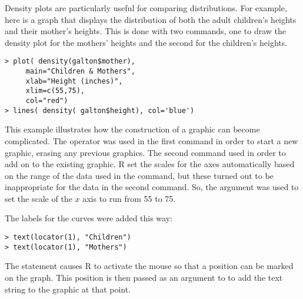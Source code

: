 Density plots are particularly useful for comparing distributions.
For example, here is a graph that displays the distribution of both
the adult children's heights and their mother's heights.  This is done
with two commands, one to draw the density plot for the mothers'
heights and the second for the children's heights.  
\begin{verbatim}
> plot( density(galton$mother), 
     main="Children & Mothers", 
     xlab="Height (inches)",
     xlim=c(55,75), 
     col="red")
> lines( density( galton$height), col='blue')
\end{verbatim}
\noindent {}
This example illustrates how the construction of a graphic can become
complicated.  The  operator was used in the first command
in order to start a new graphic, erasing any previous graphics.  
The second command used 
in order to add on to the existing graphic.  R set the scales for the
axes automatically based on the range of the data used in the
 command, but these turned out to be inappropriate for the
data in the second command.  So, the  argument was used to
set the scale of the $x$ axis to run from 55 to 75.

The labels for the curves were added this way:
\begin{verbatim}
> text(locator(1), "Children")
> text(locator(1), "Mothers")
\end{verbatim}
The  statement causes R to activate the mouse so that
a position can be marked on the graph.  This position is then passed
as an argument to  to add the text string to the graphic at
that point.
